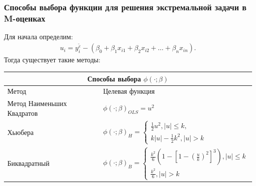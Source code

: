 \documentclass[12pt]{article}
\begin{document}
\subsubsection{Способы выбора  функции для решения экстремальной задачи в M-оценках}
Для начала определим:
\begin{eqnarray}
    u_i=y_i^{\widetilde{\varepsilon}}-(\beta_0+\beta_1 x_{i1}+\beta_2 x_{i2}+\dots+\beta_n x_{in}).
\end{eqnarray}
Тогда существует такие методы\cite{RobustRegression}:\hfill\break
\begin{center}
\begin{tabular}{ |p{3cm}|p{10cm} | }
    \hline
    \multicolumn{2}{|c|}{Способы выбора $\phi(\cdot;\beta)$} \\
    \hline
    Метод& Целевая функция\\
    \hline
    Метод Наименьших Квадратов&$\phi(\cdot;\beta)_{OLS}=u^2$\\
    \hline
    Хьюбера&$\phi(\cdot;\beta)_{H}=
        \begin{cases}
            \frac{1}{2}u^2, |u|\leq k,\\
            k|u|-\frac{1}{2}k^2, |u|>k
        \end{cases}$\\
    \hline
    Биквадратный& $\phi(\cdot;\beta)_{B}=
    \begin{cases}
        \frac{k^2}{6}(1-[1-(\frac{u}{k})^2]^3), |u|\leq k\\
        \frac{k^2}{6}, |u|>k
    \end{cases}$\\
    \hline
\end{tabular}
\end{center}
\newpage
\end{document}
